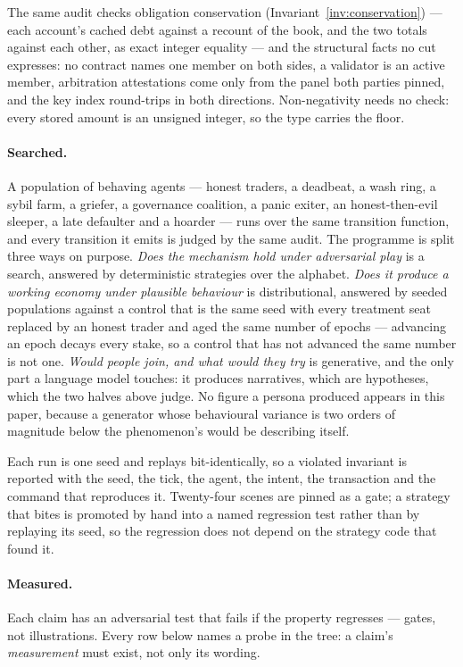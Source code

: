 The same audit checks obligation conservation (Invariant~\ref{inv:conservation}) --- each
account's cached debt against a recount of the book, and the two totals against each
other, as exact integer equality --- and the structural facts no cut expresses: no contract
names one member on both sides, a validator is an active member, arbitration attestations
come only from the panel both parties pinned, and the key index round-trips in both
directions. Non-negativity needs no check: every stored amount is an unsigned integer, so
the type carries the floor.

\paragraph{Searched.} A population of behaving agents --- honest traders, a deadbeat, a
wash ring, a sybil farm, a griefer, a governance coalition, a panic exiter, an
honest-then-evil sleeper, a late defaulter and a hoarder --- runs over the same transition
function, and every transition it emits is judged by the same audit. The programme is
split three ways on purpose. \emph{Does the mechanism hold under adversarial play} is a
search, answered by deterministic strategies over the alphabet. \emph{Does it produce a
working economy under plausible behaviour} is distributional, answered by seeded
populations against a control that is the same seed with every treatment seat replaced
by an honest trader and aged the same number of epochs --- advancing an epoch decays every
stake, so a control that has not advanced the same number is not one. \emph{Would people
join, and what would they try} is generative, and the only part a language model touches:
it produces narratives, which are hypotheses, which the two halves above judge. No figure
a persona produced appears in this paper, because a generator whose behavioural variance
is two orders of magnitude below the phenomenon's would be describing itself.

Each run is one seed and replays bit-identically, so a violated invariant is reported
with the seed, the tick, the agent, the intent, the transaction and the command that
reproduces it. Twenty-four scenes are pinned as a gate; a strategy that bites is promoted by
hand into a named regression test rather than by replaying its seed, so the regression
does not depend on the strategy code that found it.

\paragraph{Measured.} Each claim has an adversarial test that fails if the property
regresses --- gates, not illustrations. Every row below names a probe in the tree: a
claim's \emph{measurement} must exist, not only its wording.


